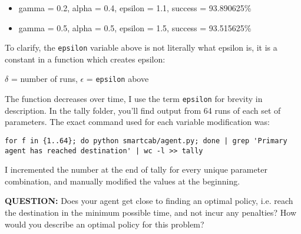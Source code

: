 \documentclass[11pt]{article}
\begin{document}
\begin{itemize}
\item gamma = 0.2, alpha = 0.4, epsilon = 1.1, success = 93.890625\%
\item gamma = 0.5, alpha = 0.5, epsilon = 1.5, success = 93.515625\%
\end{itemize}

To clarify, the \texttt{epsilon} variable above is not literally what epsilon is, it is a constant in a function which creates epsilon:

\(\delta\) = number of runs, \(\epsilon\) = \texttt{epsilon} above

\begin{center}
\vspace{7em}

\vspace{-10em}
\hspace{5em}
\end{center}

The function decreases over time, I use the term \texttt{epsilon} for brevity in description. In the tally folder, you'll find output from 64 runs of each set of parameters. The exact command used for each variable modification was:

\begin{lstlisting}
for f in {1..64}; do python smartcab/agent.py; done | grep 'Primary agent has reached destination' | wc -l >> tally
\end{lstlisting}

I incremented the number at the end of tally for every unique parameter combination, and manually modified the values at the beginning.

\noindent
\textbf{QUESTION:} Does your agent get close to finding an optimal policy, i.e. reach the destination in the minimum possible time, and not incur any penalties? How would you describe an optimal policy for this problem?
\end{document}
